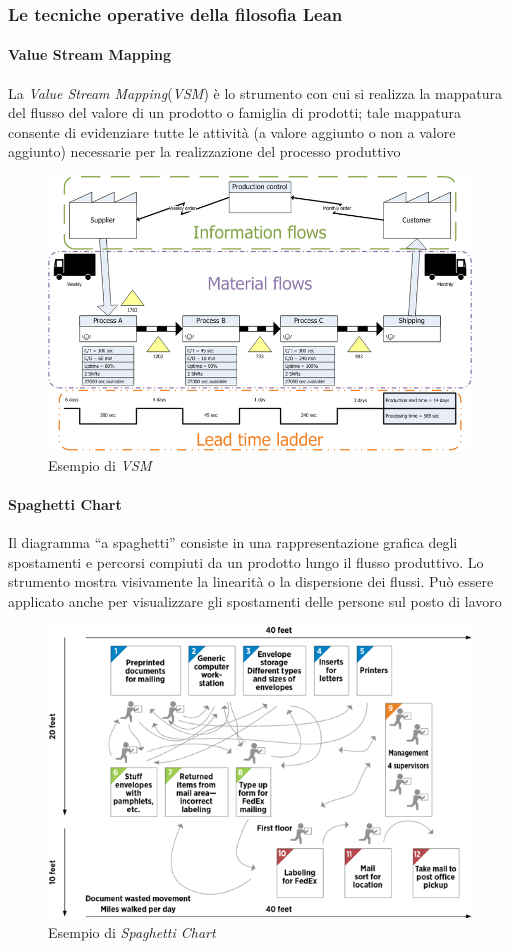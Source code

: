 \subsubsection{Le tecniche operative della filosofia Lean}
\paragraph{Value Stream Mapping}
La \textit{Value Stream Mapping}(\textit{VSM}) è lo strumento con cui si realizza la mappatura del flusso del valore di un prodotto o famiglia di prodotti; tale mappatura consente di evidenziare tutte le attività (a valore aggiunto o non a valore aggiunto) necessarie per la realizzazione del processo produttivo

\begin{figure}[t!]
	\includegraphics[width=0.7\linewidth]{resources/chapters/OrganizzazioneAziendale/images/vsm.png}
	\centering
	\caption{Esempio di \textit{VSM}}
\end{figure}

\paragraph{Spaghetti Chart}
Il diagramma “a spaghetti” consiste in una rappresentazione grafica degli spostamenti e percorsi compiuti da un prodotto lungo il flusso produttivo. Lo strumento mostra visivamente la linearità o la dispersione dei flussi. Può essere applicato anche per visualizzare gli spostamenti delle persone sul posto di lavoro

\begin{figure}[h!]
	\includegraphics[width=0.8\linewidth]{resources/chapters/OrganizzazioneAziendale/images/spaghetti-chart.png}
	\centering
	\caption{Esempio di \textit{Spaghetti Chart}}
\end{figure}


